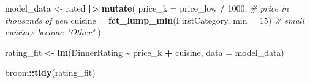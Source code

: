 \documentclass[
]{article}
\newenvironment{Shaded}{\begin{snugshade}}{\end{snugshade}}
\newcommand{\AttributeTok}[1]{\textcolor[rgb]{0.13,0.29,0.53}{#1}}
\newcommand{\CommentTok}[1]{\textcolor[rgb]{0.56,0.35,0.01}{\textit{#1}}}
\newcommand{\DecValTok}[1]{\textcolor[rgb]{0.00,0.00,0.81}{#1}}
\newcommand{\FunctionTok}[1]{\textcolor[rgb]{0.13,0.29,0.53}{\textbf{#1}}}
\newcommand{\NormalTok}[1]{#1}
\newcommand{\OtherTok}[1]{\textcolor[rgb]{0.56,0.35,0.01}{#1}}
\newcommand{\SpecialCharTok}[1]{\textcolor[rgb]{0.81,0.36,0.00}{\textbf{#1}}}
\begin{document}
\begin{Shaded}
\begin{Highlighting}[]
\NormalTok{model\_data }\OtherTok{\textless{}{-}}\NormalTok{ rated }\SpecialCharTok{|\textgreater{}}
  \FunctionTok{mutate}\NormalTok{(}
    \AttributeTok{price\_k =}\NormalTok{ price\_low }\SpecialCharTok{/} \DecValTok{1000}\NormalTok{,                      }\CommentTok{\# price in thousands of yen}
    \AttributeTok{cuisine =} \FunctionTok{fct\_lump\_min}\NormalTok{(FirstCategory, }\AttributeTok{min =} \DecValTok{15}\NormalTok{)  }\CommentTok{\# small cuisines become "Other"}
\NormalTok{  )}

\NormalTok{rating\_fit }\OtherTok{\textless{}{-}} \FunctionTok{lm}\NormalTok{(DinnerRating }\SpecialCharTok{\textasciitilde{}}\NormalTok{ price\_k }\SpecialCharTok{+}\NormalTok{ cuisine, }\AttributeTok{data =}\NormalTok{ model\_data)}

\NormalTok{broom}\SpecialCharTok{::}\FunctionTok{tidy}\NormalTok{(rating\_fit)}
\end{Highlighting}
\end{Shaded}
\end{document}
